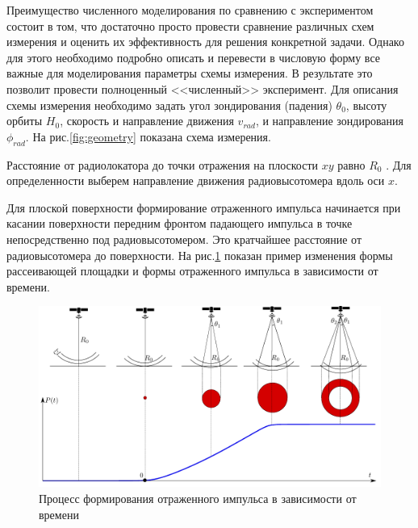 Преимущество численного моделирования по сравнению с экспериментом состоит в
том, что достаточно просто провести сравнение различных схем измерения и
оценить их эффективность для решения конкретной задачи. Однако для этого
необходимо подробно описать и перевести в числовую форму все важные для
моделирования параметры схемы измерения. В результате это позволит провести
полноценный <<численный>> эксперимент.  Для описания схемы измерения необходимо
задать угол зондирования (падения) $\theta_0$, высоту орбиты $H_0$, скорость и
направление движения $v_{rad}$, и направление зондирования $\phi_{rad}$. На рис.\ref{fig:geometry} показана схема измерения. 

Расстояние от радиолокатора до точки отражения на плоскости $xy$ равно $R_0$ .
Для определенности выберем направление движения радиовысотомера вдоль оси $x$.


Для плоской поверхности формирование отраженного импульса начинается при
касании поверхности передним фронтом падающего импульса в точке непосредственно
под радиовысотомером. Это кратчайшее расстояние от радиовысотомера до
поверхности. На рис.\ref{fig:wave_form} показан пример изменения формы
рассеивающей площадки и формы отраженного импульса в зависимости от времени.
\begin{figure}[h]
    \centering
    \includegraphics[]{fig/flat_wave1.pdf}
    \caption{Процесс формирования отраженного импульса в зависимости от времени}
    \label{fig:wave_form}
\end{figure}


